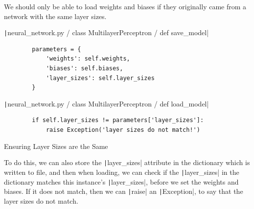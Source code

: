 \documentclass[12pt]{report}
\newcommand{\pil}[1]{\protect\texttt|#1|}
\begin{document}
\begin{center}
\end{center}

We should only be able to load weights and biases if they originally came from a network with the same layer sizes.

\begin{listing}[H]
\pil{neural_network.py / class MultilayerPerceptron / def save_model}
\begin{verbatim}
        parameters = {
            'weights': self.weights,
            'biases': self.biases,
            'layer_sizes': self.layer_sizes
        }
\end{verbatim}
\pil{neural_network.py / class MultilayerPerceptron / def load_model}
\begin{verbatim}
        if self.layer_sizes != parameters['layer_sizes']:
            raise Exception('layer sizes do not match!')
\end{verbatim}
\caption{Ensuring Layer Sizes are the Same}\label{cs:sameLayerSizes}
\end{listing}

To do this, we can also store the \pil{layer_sizes} attribute in the dictionary which is written to file, and then when loading, we can check if the \pil{layer_sizes} in the dictionary matches this instance's \pil{layer_sizes}, before we set the weights and biases. If it does not match, then we can \pil{raise} an \pil{Exception}, to say that the layer sizes do not match.

\begin{center}
\end{center}
\end{document}
